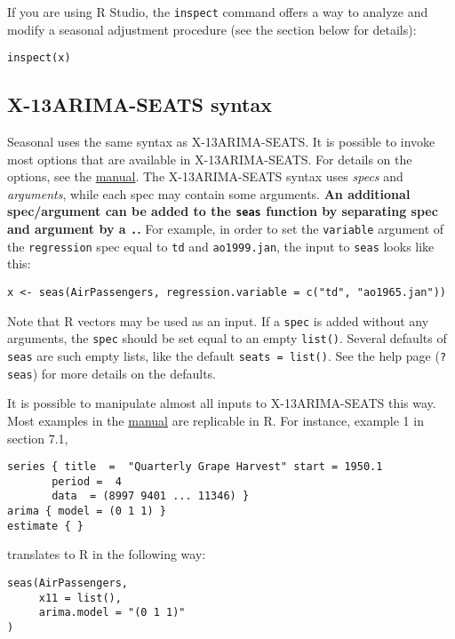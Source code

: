 If you are using R Studio, the \texttt{inspect} command offers a way to
analyze and modify a seasonal adjustment procedure (see the section
below for details):

\begin{verbatim}
inspect(x)
\end{verbatim}

\subsection{X-13ARIMA-SEATS syntax}\label{x-13arima-seats-syntax}

Seasonal uses the same syntax as X-13ARIMA-SEATS. It is possible to
invoke most options that are available in X-13ARIMA-SEATS. For details
on the options, see the
\href{http://www.census.gov/ts/x13as/docX13AS.pdf}{manual}. The
X-13ARIMA-SEATS syntax uses \emph{specs} and \emph{arguments}, while
each spec may contain some arguments. \textbf{An additional
spec/argument can be added to the \texttt{seas} function by separating
spec and argument by a \texttt{.}.} For example, in order to set the
\texttt{variable} argument of the \texttt{regression} spec equal to
\texttt{td} and \texttt{ao1999.jan}, the input to \texttt{seas} looks
like this:

\begin{verbatim}
x <- seas(AirPassengers, regression.variable = c("td", "ao1965.jan"))
\end{verbatim}

Note that R vectors may be used as an input. If a \texttt{spec} is added
without any arguments, the \texttt{spec} should be set equal to an empty
\texttt{list()}. Several defaults of \texttt{seas} are such empty lists,
like the default \texttt{seats = list()}. See the help page
(\texttt{?seas}) for more details on the defaults.

It is possible to manipulate almost all inputs to X-13ARIMA-SEATS this
way. Most examples in the
\href{http://www.census.gov/ts/x13as/docX13AS.pdf}{manual} are
replicable in R. For instance, example 1 in section 7.1,

\begin{verbatim}
series { title  =  "Quarterly Grape Harvest" start = 1950.1
       period =  4
       data  = (8997 9401 ... 11346) }
arima { model = (0 1 1) }
estimate { }
\end{verbatim}

translates to R in the following way:

\begin{verbatim}
seas(AirPassengers,
     x11 = list(),
     arima.model = "(0 1 1)"
)
\end{verbatim}

